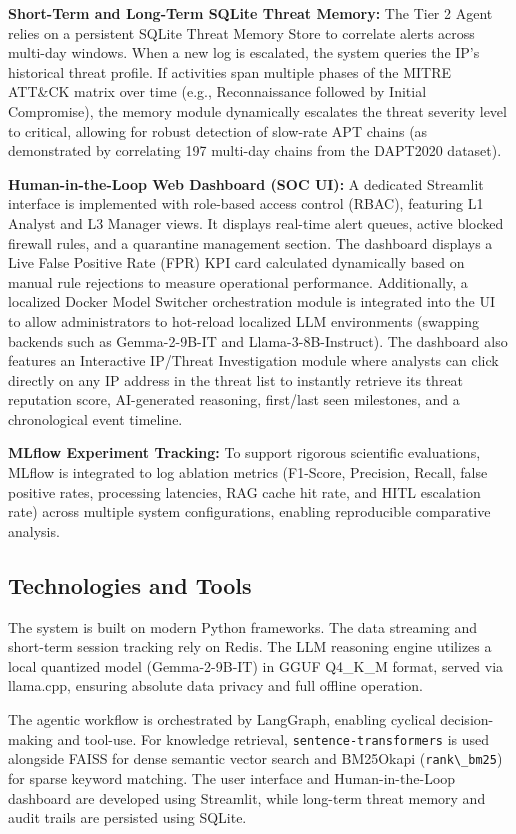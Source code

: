 \documentclass[12pt,a4paper]{article}
\begin{document}
\textbf{Short-Term and Long-Term SQLite Threat Memory:} The Tier 2 Agent relies on a persistent SQLite Threat Memory Store to correlate alerts across multi-day windows. When a new log is escalated, the system queries the IP's historical threat profile. If activities span multiple phases of the MITRE ATT\&CK matrix over time (e.g., Reconnaissance followed by Initial Compromise), the memory module dynamically escalates the threat severity level to critical, allowing for robust detection of slow-rate APT chains (as demonstrated by correlating 197 multi-day chains from the DAPT2020 dataset).

\textbf{Human-in-the-Loop Web Dashboard (SOC UI):} A dedicated Streamlit interface is implemented with role-based access control (RBAC), featuring L1 Analyst and L3 Manager views. It displays real-time alert queues, active blocked firewall rules, and a quarantine management section. The dashboard displays a Live False Positive Rate (FPR) KPI card calculated dynamically based on manual rule rejections to measure operational performance. Additionally, a localized Docker Model Switcher orchestration module is integrated into the UI to allow administrators to hot-reload localized LLM environments (swapping backends such as Gemma-2-9B-IT and Llama-3-8B-Instruct). The dashboard also features an Interactive IP/Threat Investigation module where analysts can click directly on any IP address in the threat list to instantly retrieve its threat reputation score, AI-generated reasoning, first/last seen milestones, and a chronological event timeline.

\textbf{MLflow Experiment Tracking:} To support rigorous scientific evaluations, MLflow is integrated to log ablation metrics (F1-Score, Precision, Recall, false positive rates, processing latencies, RAG cache hit rate, and HITL escalation rate) across multiple system configurations, enabling reproducible comparative analysis.

\subsection{Technologies and Tools}
The system is built on modern Python frameworks. The data streaming and short-term session tracking rely on Redis. The LLM reasoning engine utilizes a local quantized model (Gemma-2-9B-IT) in GGUF Q4\_K\_M format, served via llama.cpp, ensuring absolute data privacy and full offline operation.

The agentic workflow is orchestrated by LangGraph, enabling cyclical decision-making and tool-use. For knowledge retrieval, \verb|sentence-transformers| is used alongside FAISS for dense semantic vector search and BM25Okapi (\verb|rank\_bm25|) for sparse keyword matching. The user interface and Human-in-the-Loop dashboard are developed using Streamlit, while long-term threat memory and audit trails are persisted using SQLite.
\end{document}
